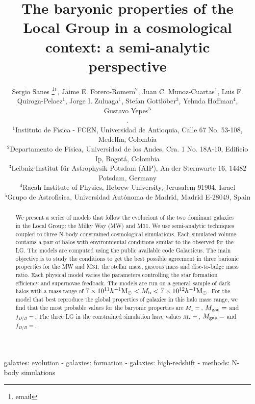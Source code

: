 \documentclass[usenatbib]{mn2e}
\newcommand{\hMsun}{{\ifmmode{h^{-1}{\rm {M_{\odot}}}}\else{$h^{-1}{\rm{M_{\odot}}}$}\fi}}
\begin{document}
\title[The baryonic properties of the Local Group using SAMs]{The baryonic properties of the Local
  Group in a cosmological context: a semi-analytic perspective} 
\author[Sanes et al.]{
\parbox[t]{\textwidth}{\raggedright 
  Sergio Sanes \thanks{email}$^1$, 
  Jaime E. Forero-Romero$^2$,
  Juan C. Munoz-Cuartas$^1$,
  Luis F. \\Quiroga-Pelaez$^1$,
  Jorge I. Zuluaga$^1$,
  Stefan Gottl\"ober$^3$,
  Yehuda Hoffman$^4$,\\  
  Gustavo Yepes$^5$}.
\vspace*{6pt}\\
$^1$Instituto de F\'{\i}sica - FCEN, Universidad de Antioquia, Calle
67 No. 53-108, Medell\'{\i}n, Colombia\\ 
$^2$Departamento de F\'{i}sica, Universidad de los Andes, Cra. 1
No. 18A-10, Edificio Ip, Bogot\'a, Colombia\\ 
$^3$Leibniz-Institut f\"ur Astrophysik Potsdam (AIP), An der
Sternwarte 16, 14482 Potsdam, Germany\\  
$^4$Racah Institute of Physics, Hebrew University, Jerusalem 91904, 
 Israel\\ 
$^5$Grupo de Astrof\'{\i}sica, Universidad Aut\'onoma de Madrid, Madrid
E-28049, Spain\\
}
\maketitle

\begin{abstract}
We present a series of models that follow the evoluciont of the two
dominant galaxies in the Local Group: the Milky Way (MW) and M31. We
use semi-analytic techniques coupled to three N-body constrained
cosmological simulations. Each simulated volume contains a pair of halos
with environmental conditions similar to the observed for the LG. The
models are computed using the public available code Galacticus. The
main objective is to study the conditions to get the best possible
agreement in three barionic properties for the MW and M31: the stellar
mass, gaseous mass and disc-to-bulge mass ratio.  Each physical
model varies the parameters controlling the star formation efficiency
and supernovae feedback. The models are run on a general sample of
dark halos with a mass range of $7\times10^{11}\hMsun<M_{\rm
  h}<7\times 10^{12}\hMsun$. For the model that best reproduce the
global properties of galaxies in this halo mass range,  we find that
the most probable values for the baryonic properties are $M_{\star}=$,
$M_{\rm gas}=$ and $f_{D/B}=$. The three LG in the constrained
simulation have values $M_{\star}=$, $M_{\rm gas}=$ and $f_{D/B}=$.



\end{abstract}
\begin{keywords}
galaxies: evolution - galaxies: formation -
galaxies: high-redshift - methods: N-body simulations
\end{keywords}
\end{document}
